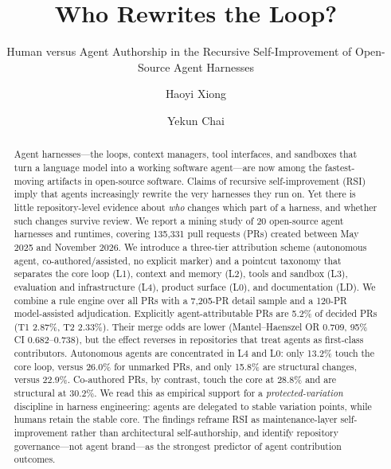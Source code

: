 \documentclass[sigconf,review]{acmart}
\begin{document}
\setlength{\emergencystretch}{3em}

\title{Who Rewrites the Loop?}
\subtitle{Human versus Agent Authorship in the Recursive Self-Improvement of Open-Source Agent Harnesses}

\author{Haoyi Xiong}

\author{Yekun Chai}

\begin{abstract}
Agent harnesses---the loops, context managers, tool interfaces, and sandboxes that turn a language model \citep{chen2021} into a working software agent---are now among the fastest-moving artifacts in open-source software. Claims of recursive self-improvement (RSI) imply that agents increasingly rewrite the very harnesses they run on. Yet there is little repository-level evidence about \emph{who} changes which part of a harness, and whether such changes survive review. We report a mining study of 20 open-source agent harnesses and runtimes, covering 135,331 pull requests (PRs) created between May 2025 and November 2026. We introduce a three-tier attribution scheme (autonomous agent, co-authored/assisted, no explicit marker) and a pointcut taxonomy that separates the core loop (L1), context and memory (L2), tools and sandbox (L3), evaluation and infrastructure (L4), product surface (L0), and documentation (LD). We combine a rule engine over all PRs with a 7,205-PR detail sample and a 120-PR model-assisted adjudication. Explicitly agent-attributable PRs are 5.2\% of decided PRs (T1 2.87\%, T2 2.33\%). Their merge odds are lower (Mantel--Haenszel OR 0.709, 95\% CI 0.682--0.738), but the effect reverses in repositories that treat agents as first-class contributors. Autonomous agents are concentrated in L4 and L0: only 13.2\% touch the core loop, versus 26.0\% for unmarked PRs, and only 15.8\% are structural changes, versus 22.9\%. Co-authored PRs, by contrast, touch the core at 28.8\% and are structural at 30.2\%. We read this as empirical support for a \emph{protected-variation} discipline in harness engineering: agents are delegated to stable variation points, while humans retain the stable core. The findings reframe RSI as maintenance-layer self-improvement rather than architectural self-authorship, and identify repository governance---not agent brand---as the strongest predictor of agent contribution outcomes.\end{abstract}

\end{document}
